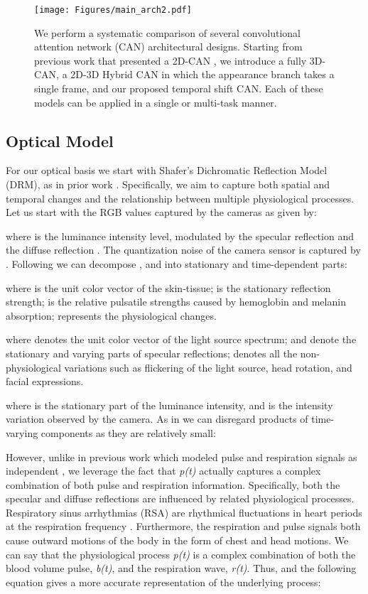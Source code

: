 \documentclass{article}
\begin{document}
\begin{figure*}[t!]
  \texttt{[image: Figures/main\_arch2.pdf]}
  \caption{We perform a systematic comparison of several convolutional attention network (CAN) architectural designs. Starting from previous work that presented a 2D-CAN \citep{chen2018deepmag}, we introduce a fully 3D-CAN, a 2D-3D Hybrid CAN in which the appearance branch takes a single frame, and our proposed temporal shift CAN. Each of these models can be applied in a single or multi-task manner.}
  \label{fig:architecture}
  \vspace{-0.3cm}
\end{figure*}

\subsection{Optical Model}
For our optical basis we start with Shafer's Dichromatic Reflection Model (DRM), as in prior work \citep{wang2016algorithmic,chen2018deepphys}. Specifically, we aim to capture both spatial and temporal changes and the relationship between multiple physiological processes. Let us start with the RGB values captured by the cameras as given by:

where  is the luminance intensity level, modulated by the specular reflection  and the diffuse reflection . The quantization noise of the camera sensor is captured by . Following \cite{wang2016algorithmic} we can decompose ,  and  into stationary and time-dependent parts:

where  is the unit color vector of the skin-tissue;  is the stationary reflection strength;  is the relative pulsatile strengths caused by hemoglobin and melanin absorption;  represents the physiological changes.

where  denotes the unit color vector of the light source spectrum;  and  denote the stationary and varying parts of specular reflections;  denotes all the non-physiological variations such as flickering of the light source, head rotation, and facial expressions.  

where  is the stationary part of the luminance intensity, and  is the intensity variation observed by the camera. As in \citep{chen2018deepphys} we can disregard products of time-varying components as they are relatively small:

However, unlike in previous work which modeled pulse and respiration signals as independent \citep{chen2018deepmag}, we leverage the fact that \textit{p(t)} actually captures a complex combination of both pulse and respiration information. Specifically, both the specular and diffuse reflections are influenced by related physiological processes. Respiratory sinus arrhythmias (RSA) are rhythmical fluctuations in heart periods at the respiration frequency \citep{berntson1993respiratory}. Furthermore, the respiration and pulse signals both cause outward motions of the body in the form of chest and head motions. We can say that the physiological process \textit{p(t)} is a complex combination of both the blood volume pulse, \textit{b(t)}, and the respiration wave, \textit{r(t)}. Thus,  and the following equation gives a more accurate representation of the underlying process:
\end{document}
